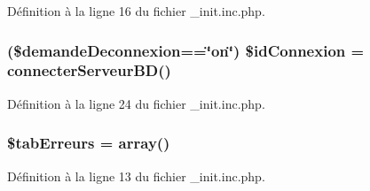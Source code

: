 Définition à la ligne 16 du fichier \-\_\-init.\-inc.\-php.

\hypertarget{__init_8inc_8php_ae48ae6a6b06018043563b88782bd2bee}{
\subsubsection[{\$id\-Connexion}]{ (\$demande\-Deconnexion==\char`\"{}on\char`\"{}) \$id\-Connexion = {\bf connecter\-Serveur\-B\-D}()}}\label{__init_8inc_8php_ae48ae6a6b06018043563b88782bd2bee}


Définition à la ligne 24 du fichier \-\_\-init.\-inc.\-php.

\hypertarget{__init_8inc_8php_aaab0cf947dbef94de72bc55c49555684}{
\subsubsection[{\$tab\-Erreurs}]{\setlength{\rightskip}{0pt plus 5cm}\$tab\-Erreurs = array()}}\label{__init_8inc_8php_aaab0cf947dbef94de72bc55c49555684}


Définition à la ligne 13 du fichier \-\_\-init.\-inc.\-php.

